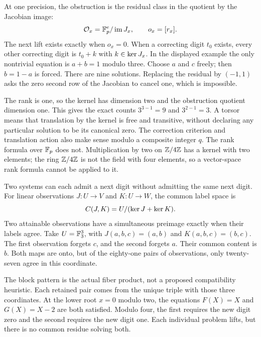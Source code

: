At one precision, the obstruction is the residual class in the quotient by the Jacobian image:
\[
 \mathcal O_x=\mathbb F_p^e/\operatorname{im} J_x,\qquad o_x=[r_x].
\]
The next lift exists exactly when $o_x=0$. When a correcting digit $t_0$ exists, every other correcting digit is $t_0+k$ with $k\in\operatorname{ker} J_x$.
In the displayed example the only nontrivial equation is $a+b=1$ modulo three. Choose $a$ and $c$ freely; then $b=1-a$ is forced. There are nine solutions. Replacing the residual by $(-1,1)$ asks the zero second row of the Jacobian to cancel one, which is impossible.

The rank is one, so the kernel has dimension two and the obstruction quotient dimension one. This gives the exact counts $3^{3-1}=9$ and $3^{2-1}=3$. A torsor means that translation by the kernel is free and transitive, without declaring any particular solution to be its canonical zero.
The correction criterion and translation action also make sense modulo a composite integer $q$. The rank formula over $\mathbb F_p$ does not. Multiplication by two on $\mathbb Z/4\mathbb Z$ has a kernel with two elements; the ring $\mathbb Z/4\mathbb Z$ is not the field with four elements, so a vector-space rank formula cannot be applied to it.

Two systems can each admit a next digit without admitting the same next digit. For linear observations $J:U\to V$ and $K:U\to W$, the common label space is
\[
 C(J,K)=U/(\operatorname{ker} J+\operatorname{ker} K).
\]
Two attainable observations have a simultaneous preimage exactly when their labels agree.
Take $U=\mathbb F_3^3$, with $J(a,b,c)=(a,b)$ and $K(a,b,c)=(b,c)$. The first observation forgets $c$, and the second forgets $a$. Their common content is $b$. Both maps are onto, but of the eighty-one pairs of observations, only twenty-seven agree in this coordinate.

The block pattern is the actual fiber product, not a proposed compatibility heuristic. Each retained pair comes from the unique triple with those three coordinates.
At the lower root $x=0$ modulo two, the equations $F(X)=X$ and $G(X)=X-2$ are both satisfied. Modulo four, the first requires the new digit zero and the second requires the new digit one. Each individual problem lifts, but there is no common residue solving both.

